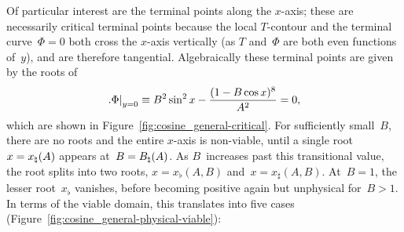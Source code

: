 Of particular interest are the terminal points along the $x$-axis;
these are necessarily critical terminal points
because the local $T$-contour and the terminal curve~$\Phi = 0$
both cross the $x$-axis vertically
(as $T$ and~$\Phi$ are both even functions of~$y$),
and are therefore tangential.
Algebraically these terminal points are given by the roots of
\begin{equation}
  \eval[\textsize]{\Phi}_{y=0}
  \ideq B^2 \sin^2 x - \frac{(1 - B \cos x)^8}{A^2}
  = 0,
  \label{eq:cosine-general-critical-terminal-point-x}
\end{equation}
which are shown in Figure~\ref{fig:cosine_general-critical}.
For sufficiently small~$B$,
there are no roots and the entire $x$-axis is non-viable,
until a single root~$x = x_\natural (A)$ appears at~$B = B_\natural (A)$.
As $B$~increases past this transitional value,
the root splits into two roots, $x = x_\flat (A, B)$ and~$x = x_\sharp (A, B)$.
At~$B = 1$, the lesser root~$x_\flat$ vanishes,
before becoming positive again but unphysical for~$B > 1$.
In terms of the viable domain, this translates into five cases
(Figure~\ref{fig:cosine_general-physical-viable}):
